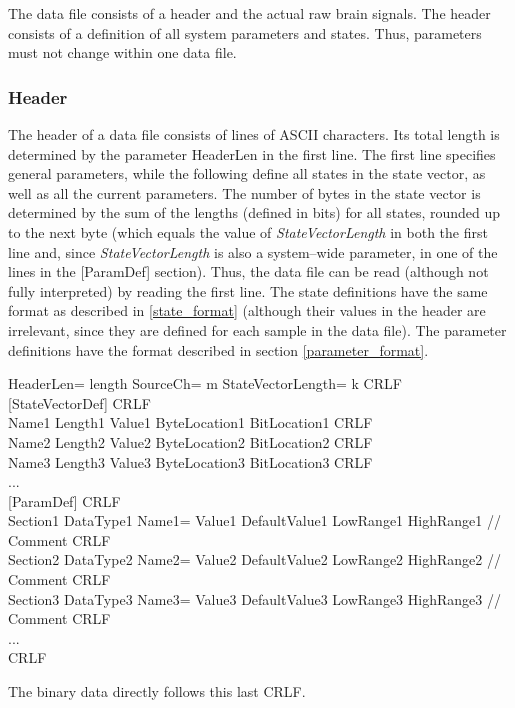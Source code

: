 \documentclass[letterpaper,oneside,12pt]{book}
\begin{document}
The data file consists of a header and the actual raw brain signals. The header 
consists of a definition of all system parameters and states. Thus, parameters 
must not change within one data file.

\subsubsection{Header}

The header of a data file consists of lines of ASCII characters. Its total 
length is determined by the parameter HeaderLen in the first line. The first 
line specifies general parameters, while the following define all states in the 
state vector, as well as all the current parameters. The number of bytes in the 
state vector is determined by the sum of the lengths (defined in bits) for all 
states, rounded up to the next byte (which equals the value of 
\textit{StateVectorLength} in both the first line and, since 
\textit{StateVectorLength} is also a system--wide parameter, in one of the lines 
in the [ParamDef] section). Thus, the data file can be read (although not fully 
interpreted) by reading the first line. The state definitions have the same 
format as described in \ref{state_format} (although their values in the header 
are irrelevant, since they are defined for each sample in the data file). The 
parameter definitions have the format described in section 
\ref{parameter_format}.

\begin{flushleft}
HeaderLen= length  SourceCh= m  StateVectorLength= k CRLF \\[1ex]
[StateVectorDef] CRLF \\[1ex]
Name1 Length1 Value1 ByteLocation1 BitLocation1 CRLF \\[1ex]
Name2 Length2 Value2 ByteLocation2 BitLocation2 CRLF \\[1ex]
Name3 Length3 Value3 ByteLocation3 BitLocation3 CRLF \\[1ex]
... \\[1ex]
[ParamDef] CRLF \\[1ex]
Section1 DataType1 Name1= Value1 DefaultValue1 LowRange1 HighRange1 // Comment CRLF \\[1ex]
Section2 DataType2 Name2= Value2 DefaultValue2 LowRange2 HighRange2 // Comment CRLF \\[1ex]
Section3 DataType3 Name3= Value3 DefaultValue3 LowRange3 HighRange3 // Comment CRLF \\[1ex]
... \\[1ex]
CRLF \\
\end{flushleft}
The binary data directly follows this last CRLF.
\end{document}
